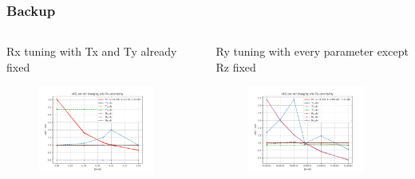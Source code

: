 \documentclass[aspectratio=1610, 12pt]{beamer}
\begin{document}
\begin{frame}\frametitle{Backup}
  \begin{columns}
    \begin{column}[c]{0.48\textwidth}
      Rx tuning with Tx and Ty already fixed 
      \begin{figure}
        \includegraphics[width=0.9\textwidth]{plots/retest/Rx_with_set_TxTy_full_fit.pdf}
      \end{figure}
    \end{column}
    \begin{column}[c]{0.48\textwidth}
      Ry tuning with every parameter except Rz fixed
      \begin{figure}
        \includegraphics[width=0.9\textwidth]{plots/retest/everything_set_but_Ry_full_fit.pdf}
      \end{figure}
    \end{column}
  \end{columns}
\end{frame}
\end{document}
